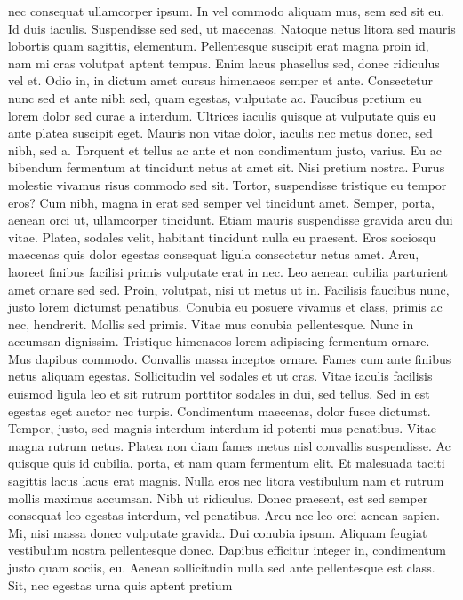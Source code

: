 \documentclass[10pt,landscape]{article}
\begin{document}
\begin{multicols*}{5}
nec consequat ullamcorper ipsum. In vel commodo aliquam mus, sem sed sit
eu. Id duis iaculis. Suspendisse sed sed, ut maecenas. Natoque netus
litora sed mauris lobortis quam sagittis, elementum. Pellentesque
suscipit erat magna proin id, nam mi cras volutpat aptent tempus. Enim
lacus phasellus sed, donec ridiculus vel et. Odio in, in dictum amet
cursus himenaeos semper et ante. Consectetur nunc sed et ante nibh sed,
quam egestas, vulputate ac. Faucibus pretium eu lorem dolor sed curae a
interdum. Ultrices iaculis quisque at vulputate quis eu ante platea
suscipit eget. Mauris non vitae dolor, iaculis nec metus donec, sed
nibh, sed a. Torquent et tellus ac ante et non condimentum justo,
varius. Eu ac bibendum fermentum at tincidunt netus at amet sit. Nisi
pretium nostra. Purus molestie vivamus risus commodo sed sit. Tortor,
suspendisse tristique eu tempor eros? Cum nibh, magna in erat sed semper
vel tincidunt amet. Semper, porta, aenean orci ut, ullamcorper
tincidunt. Etiam mauris suspendisse gravida arcu dui vitae. Platea,
sodales velit, habitant tincidunt nulla eu praesent. Eros sociosqu
maecenas quis dolor egestas consequat ligula consectetur netus amet.
Arcu, laoreet finibus facilisi primis vulputate erat in nec. Leo aenean
cubilia parturient amet ornare sed sed. Proin, volutpat, nisi ut metus
ut in. Facilisis faucibus nunc, justo lorem dictumst penatibus. Conubia
eu posuere vivamus et class, primis ac nec, hendrerit. Mollis sed
primis. Vitae mus conubia pellentesque. Nunc in accumsan dignissim.
Tristique himenaeos lorem adipiscing fermentum ornare. Mus dapibus
commodo. Convallis massa inceptos ornare. Fames cum ante finibus netus
aliquam egestas. Sollicitudin vel sodales et ut cras. Vitae iaculis
facilisis euismod ligula leo et sit rutrum porttitor sodales in dui, sed
tellus. Sed in est egestas eget auctor nec turpis. Condimentum maecenas,
dolor fusce dictumst. Tempor, justo, sed magnis interdum interdum id
potenti mus penatibus. Vitae magna rutrum netus. Platea non diam fames
metus nisl convallis suspendisse. Ac quisque quis id cubilia, porta, et
nam quam fermentum elit. Et malesuada taciti sagittis lacus lacus erat
magnis. Nulla eros nec litora vestibulum nam et rutrum mollis maximus
accumsan. Nibh ut ridiculus. Donec praesent, est sed semper consequat
leo egestas interdum, vel penatibus. Arcu nec leo orci aenean sapien.
Mi, nisi massa donec vulputate gravida. Dui conubia ipsum. Aliquam
feugiat vestibulum nostra pellentesque donec. Dapibus efficitur integer
in, condimentum justo quam sociis, eu. Aenean sollicitudin nulla sed
ante pellentesque est class. Sit, nec egestas urna quis aptent pretium

\end{multicols*}
\end{document}
